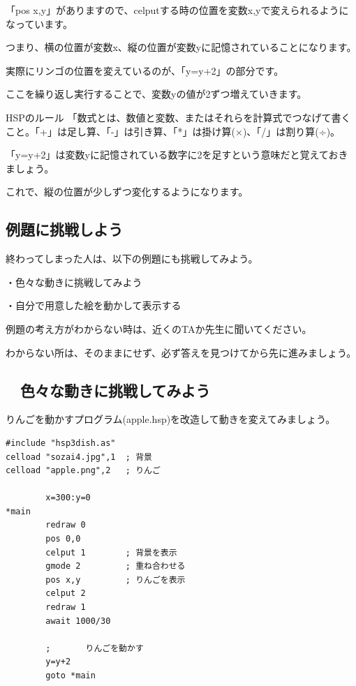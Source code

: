「pos x,y」がありますので、celputする時の位置を変数x,yで変えられるようになっています。

つまり、横の位置が変数x、縦の位置が変数yに記憶されていることになります。

実際にリンゴの位置を変えているのが、「y=y+2」の部分です。

ここを繰り返し実行することで、変数yの値が2ずつ増えていきます。


\begin{itembox}[c]{HSPのルール}
    「数式とは、数値と変数、またはそれらを計算式でつなげて書くこと。「+」は足し算、「-」は引き算、「*」は掛け算(×)、「/」は割り算(÷)。
\end{itembox}



「y=y+2」は変数yに記憶されている数字に2を足すという意味だと覚えておきましょう。

これで、縦の位置が少しずつ変化するようになります。
\newpage
\subsection{例題に挑戦しよう}


終わってしまった人は、以下の例題にも挑戦してみよう。

・色々な動きに挑戦してみよう

・自分で用意した絵を動かして表示する

例題の考え方がわからない時は、近くのTAか先生に聞いてください。

わからない所は、そのままにせず、必ず答えを見つけてから先に進みましょう。


\newpage
\subsection{\useOmetoiExample　色々な動きに挑戦してみよう}


\exampleinduction

りんごを動かすプログラム(apple.hsp)を改造して動きを変えてみましょう。

\begin{lstlisting}[caption=fall.hspのプログラム]
#include "hsp3dish.as"
celload "sozai4.jpg",1  ; 背景
celload "apple.png",2   ; りんご

        x=300:y=0
*main
        redraw 0
        pos 0,0
        celput 1        ; 背景を表示
        gmode 2         ; 重ね合わせる
        pos x,y         ; りんごを表示
        celput 2
        redraw 1
        await 1000/30

        ;       りんごを動かす
        y=y+2
        goto *main
\end{lstlisting}

